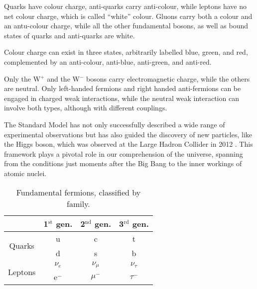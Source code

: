Quarks have colour charge, anti-quarks carry anti-colour, while leptons have no net colour charge, which is called ``white'' colour.
Gluons carry both a colour and an antu-colour charge, while all the other fundamental bosons, as well as bound states of quarks and anti-quarks are white.

Colour charge can exist in three states, arbitrarily labelled blue, green, and red, complemented by an anti-colour, anti-blue, anti-green, and anti-red.

Only the W$^+$ and the W$^-$ bosons carry electromagnetic charge, while the others are neutral.
Only left-handed fermions and right handed anti-fermions can be engaged in charged weak interactions, while the neutral weak interaction can involve both types, although with different couplings.

The Standard Model has not only successfully described a wide range of experimental observations but has also guided the discovery of new particles, like the Higgs boson, which was observed at the Large Hadron Collider in 2012 \cite{ATLASHiggsDiscovery, CMSHiggsDiscovery}.
This framework plays a pivotal role in our comprehension of the universe, spanning from the conditions just moments after the Big Bang to the inner workings of atomic nuclei.

\begin{table}[tbh]
	\centering
	\caption{Fundamental fermions, classified by family.}
	\label{tab:fermions}
	\begin{tabular}{ c c c c }
		\toprule
		 & 1$^{\text{st}}$ gen. & 2$^{\text{nd}}$ gen. & 3$^{\text{rd}}$ gen. \\%
		\midrule
		\multirow{2}{*}{Quarks}  & u       & c         & t          \\%
		                         & d       & s         & b          \\%
		\hline
		\multirow{2}{*}{Leptons} & $\nu_e$ & $\nu_\mu$ & $\nu_\tau$ \\%
		                         & e$^-$   & $\mu$$^-$ & $\tau$$^-$ \\%
		\bottomrule
	\end{tabular}
\end{table}

